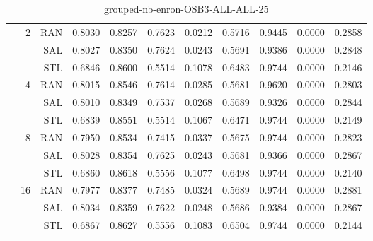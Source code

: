 \begin{center}
\begin{table}[htbp]
\begin{center}
\begin{tabular}{ | r | r | r | r | r | r | r | r | r | r | r |}
 & \multirow{3}{*}{2} & RAN & 0.8030 & 0.8257 & 0.7623 & 0.0212 & 0.5716 & 0.9445 & 0.0000 & 0.2858\\ \cline{3-11}
 &   & SAL & 0.8027 & 0.8350 & 0.7624 & 0.0243 & 0.5691 & 0.9386 & 0.0000 & 0.2848\\ \cline{3-11}
 &   & STL & 0.6846 & 0.8600 & 0.5514 & 0.1078 & 0.6483 & 0.9744 & 0.0000 & 0.2146\\ \cline{2-11}
 & \multirow{3}{*}{4} & RAN & 0.8015 & 0.8546 & 0.7614 & 0.0285 & 0.5681 & 0.9620 & 0.0000 & 0.2803\\ \cline{3-11}
 &   & SAL & 0.8010 & 0.8349 & 0.7537 & 0.0268 & 0.5689 & 0.9326 & 0.0000 & 0.2844\\ \cline{3-11}
 &   & STL & 0.6839 & 0.8551 & 0.5514 & 0.1067 & 0.6471 & 0.9744 & 0.0000 & 0.2149\\ \cline{2-11}
 & \multirow{3}{*}{8} & RAN & 0.7950 & 0.8534 & 0.7415 & 0.0337 & 0.5675 & 0.9744 & 0.0000 & 0.2823\\ \cline{3-11}
 &   & SAL & 0.8028 & 0.8354 & 0.7625 & 0.0243 & 0.5681 & 0.9366 & 0.0000 & 0.2867\\ \cline{3-11}
 &   & STL & 0.6860 & 0.8618 & 0.5556 & 0.1077 & 0.6498 & 0.9744 & 0.0000 & 0.2140\\ \cline{2-11}
 & \multirow{3}{*}{16} & RAN & 0.7977 & 0.8377 & 0.7485 & 0.0324 & 0.5689 & 0.9744 & 0.0000 & 0.2881\\ \cline{3-11}
 &   & SAL & 0.8034 & 0.8359 & 0.7622 & 0.0248 & 0.5686 & 0.9384 & 0.0000 & 0.2867\\ \cline{3-11}
 &   & STL & 0.6867 & 0.8627 & 0.5556 & 0.1083 & 0.6504 & 0.9744 & 0.0000 & 0.2144\\ \cline{2-11}
\hline
\end{tabular}
\caption{grouped-nb-enron-OSB3-ALL-ALL-25}
\end{center}
 \end{table}
\end{center}

